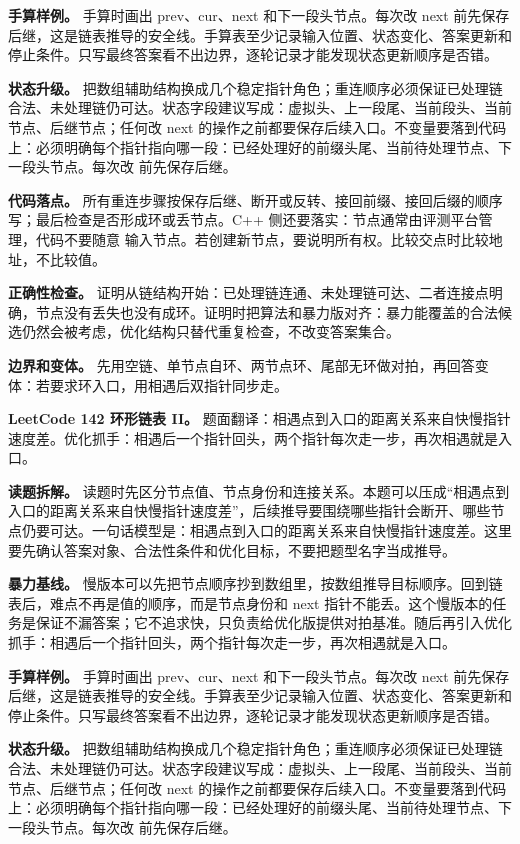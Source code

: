 \textbf{手算样例。} 手算时画出 prev、cur、next 和下一段头节点。每次改 next 前先保存后继，这是链表推导的安全线。手算表至少记录输入位置、状态变化、答案更新和停止条件。只写最终答案看不出边界，逐轮记录才能发现状态更新顺序是否错。

\textbf{状态升级。} 把数组辅助结构换成几个稳定指针角色；重连顺序必须保证已处理链合法、未处理链仍可达。状态字段建议写成：虚拟头、上一段尾、当前段头、当前节点、后继节点；任何改 next 的操作之前都要保存后续入口。不变量要落到代码上：必须明确每个指针指向哪一段：已经处理好的前缀头尾、当前待处理节点、下一段头节点。每次改  前先保存后继。

\textbf{代码落点。} 所有重连步骤按保存后继、断开或反转、接回前缀、接回后缀的顺序写；最后检查是否形成环或丢节点。C++ 侧还要落实：节点通常由评测平台管理，代码不要随意  输入节点。若创建新节点，要说明所有权。比较交点时比较地址，不比较值。

\textbf{正确性检查。} 证明从链结构开始：已处理链连通、未处理链可达、二者连接点明确，节点没有丢失也没有成环。证明时把算法和暴力版对齐：暴力能覆盖的合法候选仍然会被考虑，优化结构只替代重复检查，不改变答案集合。

\textbf{边界和变体。} 先用空链、单节点自环、两节点环、尾部无环做对拍，再回答变体：若要求环入口，用相遇后双指针同步走。

\noindent\textbf{LeetCode 142 环形链表 II。} 题面翻译：相遇点到入口的距离关系来自快慢指针速度差。优化抓手：相遇后一个指针回头，两个指针每次走一步，再次相遇就是入口。

\textbf{读题拆解。} 读题时先区分节点值、节点身份和连接关系。本题可以压成“相遇点到入口的距离关系来自快慢指针速度差”，后续推导要围绕哪些指针会断开、哪些节点仍要可达。一句话模型是：相遇点到入口的距离关系来自快慢指针速度差。这里要先确认答案对象、合法性条件和优化目标，不要把题型名字当成推导。

\textbf{暴力基线。} 慢版本可以先把节点顺序抄到数组里，按数组推导目标顺序。回到链表后，难点不再是值的顺序，而是节点身份和 next 指针不能丢。这个慢版本的任务是保证不漏答案；它不追求快，只负责给优化版提供对拍基准。随后再引入优化抓手：相遇后一个指针回头，两个指针每次走一步，再次相遇就是入口。

\textbf{手算样例。} 手算时画出 prev、cur、next 和下一段头节点。每次改 next 前先保存后继，这是链表推导的安全线。手算表至少记录输入位置、状态变化、答案更新和停止条件。只写最终答案看不出边界，逐轮记录才能发现状态更新顺序是否错。

\textbf{状态升级。} 把数组辅助结构换成几个稳定指针角色；重连顺序必须保证已处理链合法、未处理链仍可达。状态字段建议写成：虚拟头、上一段尾、当前段头、当前节点、后继节点；任何改 next 的操作之前都要保存后续入口。不变量要落到代码上：必须明确每个指针指向哪一段：已经处理好的前缀头尾、当前待处理节点、下一段头节点。每次改  前先保存后继。

